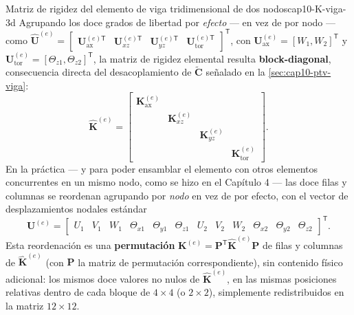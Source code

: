 \begin{ecnimportante}{Matriz de rigidez del elemento de viga tridimensional de dos nodos}{cap10-K-viga-3d}
Agrupando los doce grados de libertad por \emph{efecto} --- en vez de por nodo --- como $\hat{\bm U}^{(e)} = \begin{bmatrix}\bm U^{(e)\mathsf T}_{\text{ax}} & \bm U^{(e)\mathsf T}_{xz} & \bm U^{(e)\mathsf T}_{yz} & \bm U^{(e)\mathsf T}_{\text{tor}}\end{bmatrix}^{\mathsf T}$, con $\bm U^{(e)}_{\text{ax}}=[W_1,W_2]^{\mathsf T}$ y $\bm U^{(e)}_{\text{tor}}=[\Theta_{z1},\Theta_{z2}]^{\mathsf T}$, la matriz de rigidez elemental resulta \textbf{block-diagonal}, consecuencia directa del desacoplamiento de $\tilde{\bm C}$ señalado en la \cref{sec:cap10-ptv-viga}:
\[
\hat{\bm K}^{(e)} = \begin{bmatrix}
\bm K^{(e)}_{\text{ax}} & & & \\
& \bm K^{(e)}_{xz} & & \\
& & \bm K^{(e)}_{yz} & \\
& & & \bm K^{(e)}_{\text{tor}}
\end{bmatrix} .
\]
En la práctica --- y para poder ensamblar el elemento con otros elementos concurrentes en un mismo nodo, como se hizo en el Capítulo 4 --- las doce filas y columnas se reordenan agrupando por \emph{nodo} en vez de por efecto, con el vector de desplazamientos nodales estándar
\[
\bm U^{(e)} = \begin{bmatrix} U_1&V_1&W_1&\Theta_{x1}&\Theta_{y1}&\Theta_{z1}&U_2&V_2&W_2&\Theta_{x2}&\Theta_{y2}&\Theta_{z2}\end{bmatrix}^{\mathsf T} .
\]
Esta reordenación es una \textbf{permutación} $\bm K^{(e)}=\bm P^{\mathsf T}\hat{\bm K}^{(e)}\bm P$ de filas y columnas de $\hat{\bm K}^{(e)}$ (con $\bm P$ la matriz de permutación correspondiente), sin contenido físico adicional: los mismos doce valores no nulos de $\hat{\bm K}^{(e)}$, en las mismas posiciones relativas dentro de cada bloque de $4\times4$ (o $2\times2$), simplemente redistribuidos en la matriz $12\times12$.
\end{ecnimportante}

